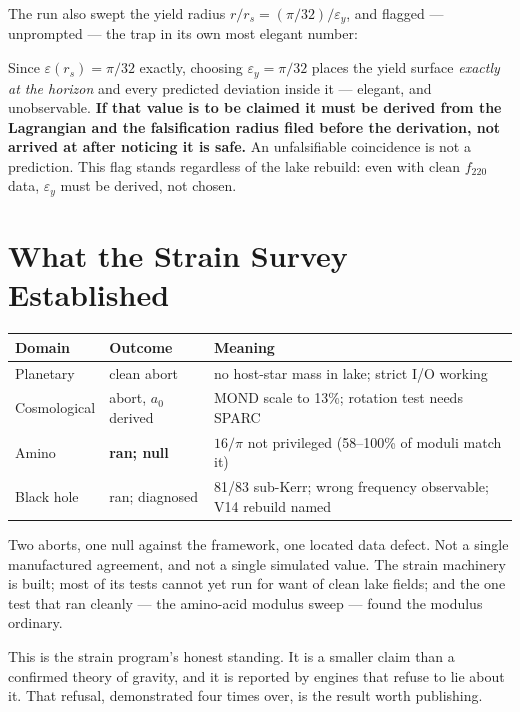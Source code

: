 \documentclass[11pt, letterpaper, openany]{book}
\begin{document}
The run also swept the yield radius $r/r_s = (\pi/32)/\varepsilon_y$, and flagged --- unprompted ---
the trap in its own most elegant number:

\begin{rulingbox}
Since $\varepsilon(r_s) = \pi/32$ exactly, choosing $\varepsilon_y = \pi/32$ places the yield
surface \emph{exactly at the horizon} and every predicted deviation inside it --- elegant, and
unobservable. \textbf{If that value is to be claimed it must be derived from the Lagrangian and the
falsification radius filed before the derivation, not arrived at after noticing it is safe.} An
unfalsifiable coincidence is not a prediction. This flag stands regardless of the lake rebuild:
even with clean $f_{220}$ data, $\varepsilon_y$ must be derived, not chosen.
\end{rulingbox}

\section{What the Strain Survey Established}

\begin{table}[H]
\centering
\small
\begin{tabular}{@{}lll@{}}
\toprule
\textbf{Domain} & \textbf{Outcome} & \textbf{Meaning} \\
\midrule
Planetary & clean abort & no host-star mass in lake; strict I/O working \\
Cosmological & abort, $a_0$ derived & MOND scale to 13\%; rotation test needs SPARC \\
Amino & \textbf{ran; null} & $16/\pi$ not privileged (58--100\% of moduli match it) \\
Black hole & ran; diagnosed & 81/83 sub-Kerr; wrong frequency observable; V14 rebuild named \\
\bottomrule
\end{tabular}
\end{table}

\begin{signalbox}
Two aborts, one null against the framework, one located data defect. Not a single manufactured
agreement, and not a single simulated value. The strain machinery is built; most of its tests cannot
yet run for want of clean lake fields; and the one test that ran cleanly --- the amino-acid modulus
sweep --- found the modulus ordinary.

\medskip
This is the strain program's honest standing. It is a smaller claim than a confirmed theory of
gravity, and it is reported by engines that refuse to lie about it. That refusal, demonstrated four
times over, is the result worth publishing.
\end{signalbox}
\end{document}
